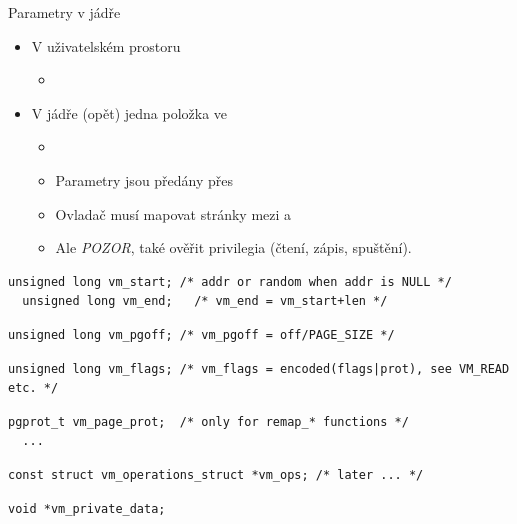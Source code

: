 \begin{frame}[fragile]{Parametry  v jádře}

  \begin{itemize}
    \item V uživatelském prostoru
    \begin{itemize}
      \item \footnotesize{}
    \end{itemize}

    \pause

    \item V jádře (opět) jedna položka ve 
    \begin{itemize}
      \item \footnotesize{}

      \pause

      \item Parametry jsou předány přes 


      \item Ovladač musí mapovat stránky mezi  a 
      \item Ale \emph{POZOR}, také ověřit privilegia (čtení, zápis, spuštění).

    \end{itemize}
  \end{itemize}

  \pause

  \begin{block}{}
    \begin{lstlisting}[belowskip=0pt]
  unsigned long vm_start; /* addr or random when addr is NULL */
  unsigned long vm_end;   /* vm_end = vm_start+len */
    \end{lstlisting}
    \pause
    \begin{lstlisting}[aboveskip=0pt,belowskip=0pt]
  unsigned long vm_pgoff; /* vm_pgoff = off/PAGE_SIZE */
    \end{lstlisting}
    \pause
    \begin{lstlisting}[aboveskip=0pt,belowskip=0pt]
  unsigned long vm_flags; /* vm_flags = encoded(flags|prot), see VM_READ etc. */
    \end{lstlisting}
    \pause
    \begin{lstlisting}[aboveskip=0pt,belowskip=0pt]
  pgprot_t vm_page_prot;  /* only for remap_* functions */
  ...
    \end{lstlisting}
    \pause
    \begin{lstlisting}[aboveskip=0pt,belowskip=0pt]
  const struct vm_operations_struct *vm_ops; /* later ... */
    \end{lstlisting}
    \pause
    \begin{lstlisting}[aboveskip=0pt]
  void *vm_private_data;
    \end{lstlisting}
  \end{block}

\end{frame}

